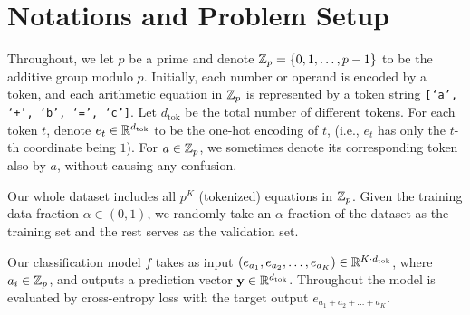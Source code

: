\section{Notations and Problem Setup}
\label{sec:prelim}

Throughout, we let $p$ be a prime and denote $\mathbb{Z}_p = \{0, 1, \dots, p-1\}$ to be the additive group modulo $p$.
Initially, each number or operand is encoded by a token, 
and each arithmetic equation in $\mathbb{Z}_p$ is represented by a token string \texttt{[`a', `+', `b', `=', `c']}.
Let $d_{\mathrm{tok}}$ be the total number of different tokens.
For each token $t$, denote $e_t \in \mathbb{R}^{d_{\mathrm{tok}}}$ to be the one-hot encoding of $t$, (i.e., $e_t$ has only the $t$-th coordinate being $1$).
For $a \in \mathbb{Z}_p$, we sometimes denote its corresponding token also by $a$, without causing any confusion.

Our whole dataset includes all $p^K$ (tokenized) equations in $\mathbb{Z}_p$.
Given the training data fraction $\alpha\in(0,1)$, we randomly take an $\alpha$-fraction of the dataset as the training set and the rest serves as the validation set.

Our classification model $f$ takes as input $(e_{a_1}, e_{a_2}, \dots, e_{a_K}) \in \mathbb{R}^{K \cdot {d_{\mathrm{tok}}}}$, where $a_i \in \mathbb{Z}_p$, and outputs a prediction vector $\mathbf{y} \in \mathbb{R}^{{d_{\mathrm{tok}}}}$.
Throughout the model is evaluated by cross-entropy loss with the target output $e_{a_1 + a_2 + \dots + a_K}$.





